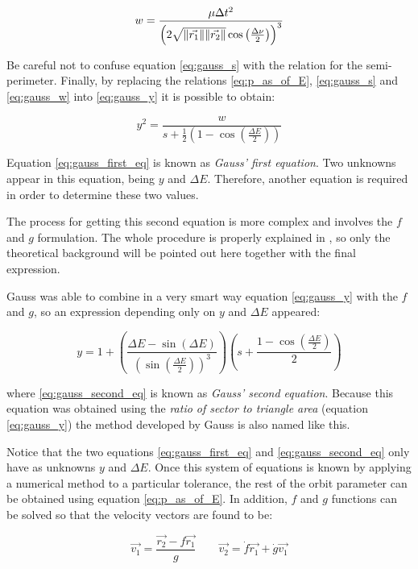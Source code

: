 \begin{equation}
  w = \frac{\mu \Delta t^2}{\left(2\sqrt{\lVert\vec{r_1}\rVert\lVert\vec{r_2}\rVert} \cos\left(\frac{\Delta \nu}{2} \right )\right)^3}
  \label{eq:gauss_w}
\end{equation}

Be careful not to confuse equation \ref{eq:gauss_s} with the relation for the
semi-perimeter. Finally, by replacing the relations \ref{eq:p_as_of_E},
\ref{eq:gauss_s} and \ref{eq:gauss_w} into \ref{eq:gauss_y} it is possible to
obtain:

\begin{equation}
  y^2 = \frac{w}{s + \frac{1}{2}\left(1 - \cos{\left(\frac{\Delta E}{2} \right)} \right)}
  \label{eq:gauss_first_eq}
\end{equation}

Equation \ref{eq:gauss_first_eq} is known as \textit{Gauss' first equation}. Two
unknowns appear in this equation, being $y$ and $\Delta E$. Therefore, another
equation is required in order to determine these two values.

The process for getting this second equation is more complex and involves the
$f$ and $g$ formulation. The whole procedure is properly explained in
\cite{bate1979}, so only the theoretical background will be pointed out here
together with the final expression.

Gauss was able to combine in a very smart way equation \ref{eq:gauss_y} with the
$f$ and $g$, so an expression depending only on $y$ and $\Delta E$ appeared:

\begin{equation}
  y = 1 + \left(\frac{\Delta E - \sin{(\Delta E)}}{\left(\sin{\left(\frac{\Delta E}{2} \right )} \right)^3} \right )\left(s + \frac{1 - \cos{\left(\frac{\Delta E}{2} \right )}}{2} \right )
  \label{eq:gauss_second_eq}
\end{equation}

where \ref{eq:gauss_second_eq} is known as \textit{Gauss' second equation}.
Because this equation was obtained using the \textit{ratio of sector to triangle
  area} (equation \ref{eq:gauss_y}) the method developed by Gauss is also named
like this.

Notice that the two equations \ref{eq:gauss_first_eq} and
\ref{eq:gauss_second_eq} only have as unknowns $y$ and $\Delta E$. Once this
system of equations is known by applying a numerical method to a particular
tolerance, the rest of the orbit parameter can be obtained using equation
\ref{eq:p_as_of_E}. In addition, $f$ and $g$ functions can be solved so that the
velocity vectors are found to be:

\begin{equation}
  \vec{v_1} = \frac{\vec{r_2} - f \vec{r_1}}{g}\quad\quad
  \vec{v_2} = \dot{f} \vec{r_1} + \dot{g} \vec{v_1}
\end{equation}


